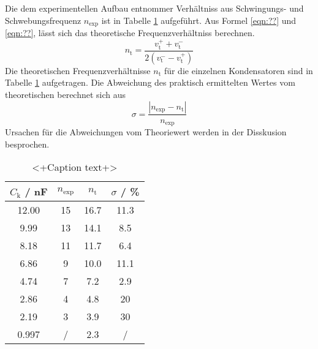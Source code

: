 Die dem experimentellen Aufbau entnommer Verhältniss aus Schwingungs- und Schwebungsfrequenz $n_\text{exp}$ ist in Tabelle \ref{tab:n} aufgeführt. Aus Formel \ref{eqn:??} und \ref{eqn:??}, lässt sich das theoretische Frequenzverhältniss berechnen.
\begin{equation}
  n_\text{t} = \frac{ v_\text{t}^+ + v_\text{t}^- }{2(v_\text{t}^- - v_\text{t}^+)}
  \label{eqn:n_t}
\end{equation}
Die theoretischen Frequenzverhältnisse $n_\text{t}$ für die einzelnen Kondensatoren sind in Tabelle \ref{tab:n} aufgetragen. Die Abweichung des praktisch ermittelten Wertes vom theoretischen berechnet sich aus 
\begin{equation}
  \sigma = \frac{| n_\text{exp} - n_\text{t} |}{n_\text{exp}}
\end{equation}
Ursachen für die Abweichungen vom Theoriewert werden in der Disskusion besprochen.
\begin{table}
  \centering
  \begin{tabular}{c c c c}
    \toprule
    $C_\text{k}$ / nF & $n_\text{exp}$ & $n_\text{t}$ & $\sigma$ / \%	\\
    \midrule
    12.00	& 15	& 16.7	& 11.3	\\
    9.99	& 13 	& 14.1	& 8.5	\\
    8.18	& 11	& 11.7	& 6.4	\\
    6.86	& 9	& 10.0	& 11.1	\\
    4.74	& 7	& 7.2	& 2.9	\\
    2.86	& 4	& 4.8	& 20	\\	
    2.19	& 3 	& 3.9	& 30	\\
    0.997	& /	& 2.3	& /	\\
    \bottomrule
  \end{tabular}
  \caption{<+Caption text+>}
  \label{tab:n}
\end{table}
